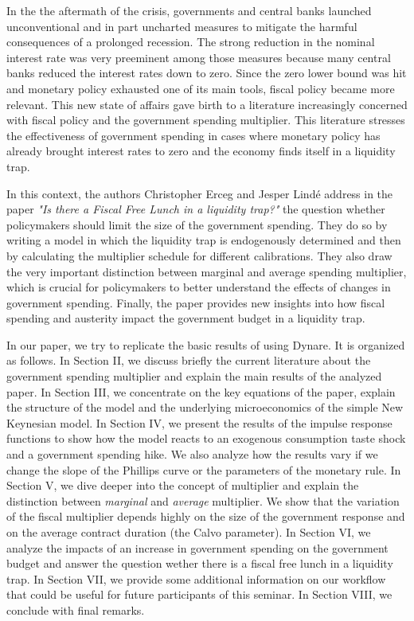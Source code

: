 \documentclass[12pt,a4paper,oneside,titlepage]{article}
\begin{document}
In the the aftermath of the crisis, governments and central banks launched unconventional and in part uncharted measures to mitigate the harmful consequences of a prolonged recession. The strong reduction in the nominal interest rate was very preeminent among those measures because many central banks reduced the interest rates down to zero. Since the zero lower bound was hit and monetary policy exhausted one of its main tools, fiscal policy became more relevant. This new state of affairs gave birth to a literature increasingly concerned with fiscal policy and the government spending multiplier. This literature stresses the effectiveness of government spending in cases where monetary policy has already brought interest rates to zero and the economy finds itself in a liquidity trap.
\par
\bigskip
In this context, the authors Christopher Erceg and Jesper Lindé address in the paper \textit{"Is there a Fiscal Free Lunch in a liquidity trap?"} the question whether policymakers should limit the size of the government spending. They do so by writing a model in which the liquidity trap is endogenously determined and then  by calculating the multiplier schedule for different calibrations. They also draw the very important distinction between marginal and average spending multiplier, which is crucial for policymakers to better understand the effects of changes in government spending. Finally, the paper provides new insights into how fiscal spending and austerity impact the government budget in a liquidity trap.
\par
\bigskip
In our paper, we try to replicate the basic results of \citet{Erceg.2014} using Dynare. It is organized as follows. In Section II, we discuss briefly the current literature about the government spending multiplier and explain the main results of the analyzed paper. In Section III, we concentrate on the key equations of the paper, explain the structure of the model and the underlying microeconomics of the simple New Keynesian model. In Section IV, we present the results of the impulse response functions to show how the model reacts to an exogenous consumption taste shock and a government spending hike. We also analyze how the results vary if we change the slope of the Phillips curve or the parameters of the monetary rule. In Section V, we dive deeper into the concept of multiplier and explain the distinction between \textit{marginal} and \textit{average} multiplier. We show that the variation of the fiscal multiplier depends highly on the size of the government response and on the average contract duration (the Calvo parameter). In Section VI, we analyze the impacts of an increase in government spending on the government budget and answer the question wether there is a fiscal free lunch in a liquidity trap. In Section VII, we provide some additional information on our workflow that could be useful for future participants of this seminar. In Section VIII, we conclude with final remarks.
\end{document}
